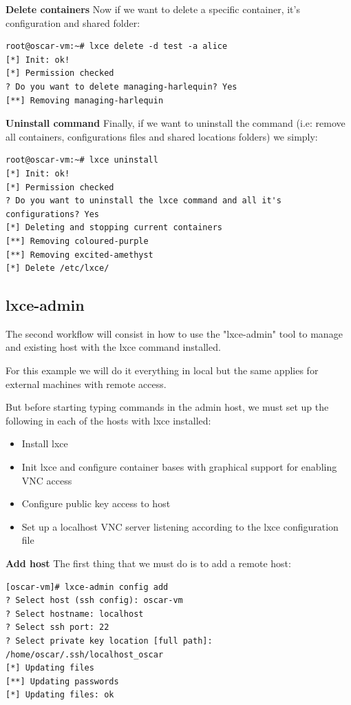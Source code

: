 \textbf{Delete containers}
Now if we want to delete a specific container, it's configuration and shared folder:

\begin{verbatim}
root@oscar-vm:~# lxce delete -d test -a alice
[*] Init: ok!
[*] Permission checked
? Do you want to delete managing-harlequin? Yes
[**] Removing managing-harlequin
\end{verbatim}

\textbf{Uninstall command}
Finally, if we want to uninstall the command (i.e: remove all containers, configurations files and shared locations folders) we simply:
\begin{verbatim}
root@oscar-vm:~# lxce uninstall
[*] Init: ok!
[*] Permission checked
? Do you want to uninstall the lxce command and all it's configurations? Yes
[*] Deleting and stopping current containers
[**] Removing coloured-purple
[**] Removing excited-amethyst
[*] Delete /etc/lxce/
\end{verbatim}

\subsection{lxce-admin}
The second workflow will consist in how to use the "lxce-admin" tool to manage and existing host with the lxce command installed.

For this example we will do it everything in local but the same applies for external machines with remote access.

But before starting typing commands in the admin host, we must set up the following in each of the hosts with lxce installed:
\begin{itemize}
	\item{Install lxce}
	\item{Init lxce and configure container bases with graphical support for enabling VNC access}
	\item{Configure public key access to host}
	\item{Set up a localhost VNC server listening according to the lxce configuration file}
\end{itemize}

\textbf{Add host}
The first thing that we must do is to add a remote host:
\begin{verbatim}
[oscar-vm]# lxce-admin config add
? Select host (ssh config): oscar-vm
? Select hostname: localhost
? Select ssh port: 22
? Select private key location [full path]: /home/oscar/.ssh/localhost_oscar
[*] Updating files
[**] Updating passwords
[*] Updating files: ok
\end{verbatim}

